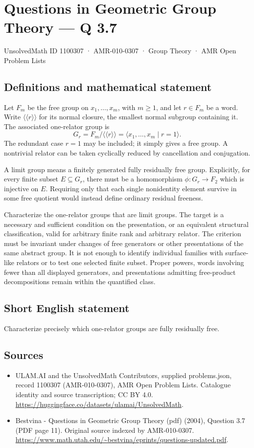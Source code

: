 \documentclass[11pt,a4paper]{article}
\begin{document}
\section*{Questions in Geometric Group Theory — Q 3.7}\label{1100307}
{\small UnsolvedMath ID 1100307 · AMR-010-0307 · Group Theory · AMR Open Problem Lists}
\subsection{Definitions and mathematical statement}
Let $F_m$ be the free group on $x_1,\ldots,x_m$, with $m\geq1$, and let $r\in F_m$ be a word. Write $\langle\!\langle r\rangle\!\rangle$ for its normal closure, the smallest normal subgroup containing it. The associated one-relator group is
\[
 G_r=F_m/\langle\!\langle r\rangle\!\rangle
      =\langle x_1,\ldots,x_m\mid r=1\rangle.
\]
The redundant case $r=1$ may be included; it simply gives a free group. A nontrivial relator can be taken cyclically reduced by cancellation and conjugation.

A limit group means a finitely generated fully residually free group. Explicitly, for every finite subset $E\subseteq G_r$, there must be a homomorphism $\phi:G_r\to F_2$ which is injective on $E$. Requiring only that each single nonidentity element survive in some free quotient would instead define ordinary residual freeness.

Characterize the one-relator groups that are limit groups. The target is a necessary and sufficient condition on the presentation, or an equivalent structural classification, valid for arbitrary finite rank and arbitrary relator. The criterion must be invariant under changes of free generators or other presentations of the same abstract group. It is not enough to identify individual families with surface-like relators or to test one selected finite subset. Proper powers, words involving fewer than all displayed generators, and presentations admitting free-product decompositions remain within the quantified class.
\subsection{Short English statement}
Characterize precisely which one-relator groups are fully residually free.
\subsection{Sources}
\begin{itemize}
\item[S1] ULAM.AI and the UnsolvedMath Contributors, supplied problems.json, record 1100307 (AMR-010-0307), AMR Open Problem Lists. Catalogue identity and source transcription; CC BY 4.0.
\url{https://huggingface.co/datasets/ulamai/UnsolvedMath}.
\item[S2] Bestvina - Questions in Geometric Group Theory (pdf) (2004), Question 3.7 (PDF page 11). Original source indexed by AMR-010-0307.
\url{https://www.math.utah.edu/~bestvina/eprints/questions-updated.pdf}.
\end{itemize}
\end{document}
